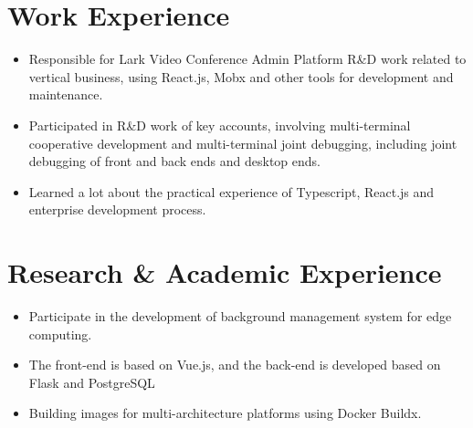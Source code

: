 \documentclass{resume}
\newcommand{\en}[1]{#1}
\newcommand{\zh}[1]{}
\begin{document}
\section{\en{Work Experience}\zh{工作经历}}
\en{}
\zh{\datedsubsection{\textbf{\href{https://www.bytedance.com/zh/}{字节跳动（ByteDance Inc.）}}}{2021/07 -- 2021/09}}
\en{}
\zh{\role{飞书会议室解决方案团队}{前端研发实习}}
\begin{itemize}
      \item \en{Responsible for Lark Video Conference Admin Platform R\&D work related to vertical business, using React.js, Mobx and other tools for development and maintenance.}
            \zh{负责飞书会议室 Admin 中会议室模块和视频会议模块相关垂直业务的前端研发，使用 React.js 和 Mobx 等工具进行业务等开发和维护}
      \item \en{Participated in R\&D work of key accounts, involving multi-terminal cooperative development and multi-terminal joint debugging, including joint debugging of front and back ends and desktop ends.}
            \zh{参与重点客户相关需求的开发，涉及到了多端合作开发与多端联合调试，包括前后端以及桌面端的联合调试}
      \item \en{Learned a lot about the practical experience of Typescript, React.js and enterprise development process.}
            \zh{学到了很多关于 Typescript，React 以及企业级开发流程的实战经验}
\end{itemize}

\section{\en{Research \& Academic Experience}\zh{研究经历}}
\en{}
\zh{\datedsubsection{\textbf{中国科学院自动化研究所}}{2019/04 -- 2020/06}}
\en{}
\zh{\role{复杂系统管理与控制国家重点实验室}{科研实习}}
\begin{itemize}
      \item \en{Participate in the development of background management system for edge computing.}
            \zh{参与构建面向边缘计算的后台管理系统开发}
      \item \en{The front-end is based on Vue.js, and the back-end is developed based on Flask and PostgreSQL}
            \zh{前端基于 Vue.js 进行开发，后端基于 Flask 和 PostgreSQL 进行开发}
      \item \en{Building images for multi-architecture platforms using Docker Buildx.}
            \zh{使用 Docker Buildx 构建多系统架构支持的 Docker 镜像并部署}
\end{itemize}
\end{document}
